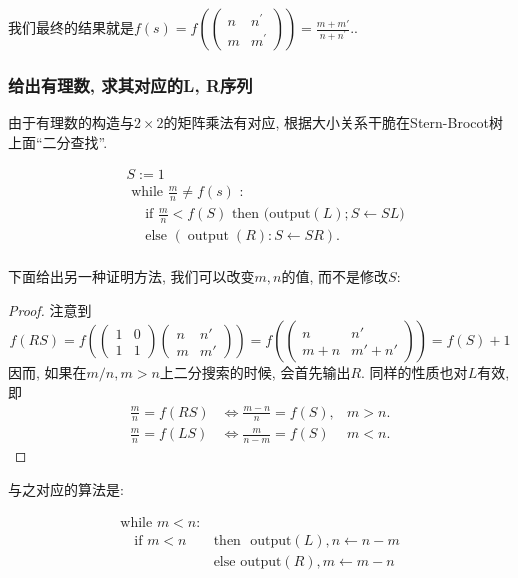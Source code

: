 \documentclass{ctexart}
\begin{document}
我们最终的结果就是$f(s)=f\left(\left(\begin{array}{ll}n & n^{\prime} \\ m & m^{\prime}\end{array}\right)\right)=\frac{m+m \prime}{n+n^{\prime}}$.. 

\subsubsection{给出有理数, 求其对应的L, R序列} 由于有理数的构造与$2 \times  2$的矩阵乘法有对应, 根据大小关系干脆在Stern-Brocot树上面``二分查找''.  

$$
\begin{aligned}
& S:=1 \\
& \text { while } \frac{m}{n} \neq f(s) \text { : } \\
& \quad \text { if } \frac{m}{n}<f(S) \text { then (output} (L);S\leftarrow SL)  \\
& \quad \text { else }(\operatorname{output}(R): S \leftarrow S R) \text {. } \\
&
\end{aligned}
$$

下面给出另一种证明方法, 我们可以改变$m, n$的值, 而不是修改$S$: 


\begin{proof}
    注意到
    $$f(RS)=f\left(\begin{pmatrix}1 & 0\\
        1 & 1
        \end{pmatrix}\begin{pmatrix}n & n'\\
        m & m'
        \end{pmatrix}\right)=f\left(\begin{pmatrix}n & n'\\
        m+n & m'+n'
        \end{pmatrix}\right)=f(S)+1
    $$
因而, 如果在$m/n, m>n$上二分搜索的时候, 会首先输出$R$. 
同样的性质也对$L$有效, 即
$$
\begin{array}{lll}
\frac{m}{n}=f(R S) & \Leftrightarrow \frac{m-n}{n}=f(S), & m>n . \\
\frac{m}{n}=f(L S) & \Leftrightarrow \frac{m}{n-m}=f(S) & m<n .
\end{array}
$$
\end{proof}

与之对应的算法是: 

\begin{align*}
    \text{while }m<n:\\
    \quad \text{if } m<n & \text{then } \text{ output}(L), n\leftarrow n-m  \\
    \quad & \text{else} \text{ output}(R), m\leftarrow m-n
\end{align*}
\end{document}
